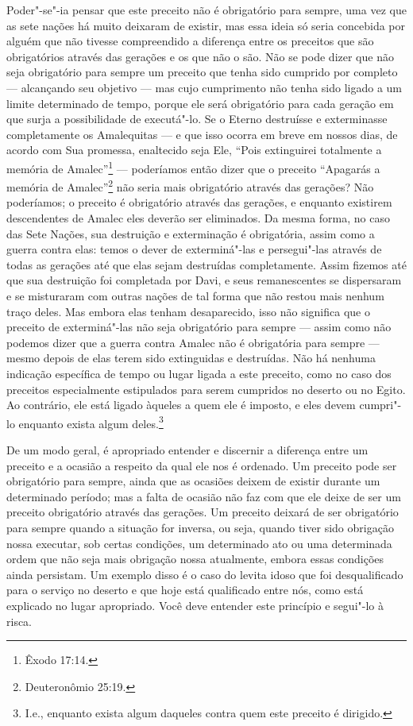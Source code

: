 \begin{multicols}{2}
Poder"-se"-ia pensar que este preceito não é obrigatório para sempre, uma
vez que as sete nações há muito deixaram de existir, mas essa ideia só
seria concebida por alguém que não tivesse compreendido a diferença
entre os preceitos que são obrigatórios através das gerações e os que não o são. Não
se pode dizer que não seja obrigatório para sempre um preceito que
tenha sido cumprido por completo --- alcançando seu objetivo --- mas
cujo cumprimento não tenha sido ligado a um limite determinado de tempo,
porque ele será obrigatório para cada geração em que surja a
possibilidade de executá"-lo. Se o Eterno destruísse e exterminasse
completamente os Amalequitas --- e que isso ocorra em breve em nossos
dias, de acordo com Sua promessa, enaltecido seja Ele, ``Pois
extinguirei totalmente a memória de Amalec\starr''\footnote{Êxodo 17:14.} ---
poderíamos então dizer que o preceito ``Apagarás a memória de Amalec\starr''\footnote{Deuteronômio 25:19.} não seria mais obrigatório através das gerações?
Não poderíamos; o preceito é obrigatório através das gerações, e
enquanto existirem descendentes de Amalec\starr{} eles deverão ser eliminados.
Da mesma forma, no caso das Sete Nações, sua destruição e exterminação é
obrigatória, assim como a guerra contra elas: temos o dever de
exterminá"-las e persegui"-las através de todas as gerações até que elas
sejam destruídas completamente. Assim fizemos até que sua destruição foi
completada por Davi, e seus remanescentes se dispersaram e se misturaram
com outras nações de tal forma que não restou mais nenhum traço deles.
Mas embora elas tenham desaparecido, isso não significa que o preceito
de exterminá"-las não seja obrigatório para sempre --- assim como não
podemos dizer que a guerra contra Amalec\starr{} não é obrigatória para sempre
--- mesmo depois de elas terem sido extinguidas e destruídas. Não há
nenhuma indicação específica de tempo ou lugar ligada a este preceito, como no caso dos
preceitos especialmente estipulados para serem cumpridos no deserto ou no Egito.
Ao contrário, ele está ligado àqueles a quem ele é imposto, e eles devem
cumpri"-lo enquanto exista algum deles.\footnote{I.e., enquanto exista algum daqueles contra quem este preceito é dirigido.}

De um modo geral, é apropriado entender e discernir a diferença
entre um preceito e a ocasião a respeito da qual ele nos é ordenado. Um
preceito pode ser obrigatório para sempre, ainda que as ocasiões deixem de
existir durante um determinado período; mas a falta de ocasião não faz
com que ele deixe de ser um preceito obrigatório através das gerações.
Um preceito deixará de ser obrigatório para sempre quando a situação for
inversa, ou seja, quando tiver sido obrigação nossa executar, sob certas
condições, um determinado ato ou uma determinada ordem que não seja mais
obrigação nossa atualmente, embora essas condições ainda persistam. Um
exemplo disso é o caso do levita\starr{} idoso que foi desqualificado para o
serviço no deserto e que hoje está qualificado entre nós, como está
explicado no lugar apropriado. Você deve entender este princípio e
segui"-lo à risca.


\end{multicols}
